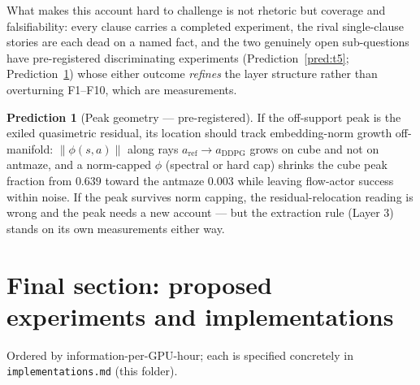 \documentclass[11pt]{article}
\theoremstyle{definition}
\newtheorem{prediction}{Prediction}
\theoremstyle{remark}
\begin{document}
What makes this account hard to challenge is not rhetoric but coverage and falsifiability:
every clause carries a completed experiment, the rival single-clause stories are each dead
on a named fact, and the two genuinely open sub-questions have pre-registered discriminating
experiments (Prediction~\ref{pred:t5}; Prediction~\ref{pred:peak}) whose either outcome
\emph{refines} the layer structure rather than overturning F1--F10, which are measurements.

\begin{prediction}[Peak geometry --- pre-registered]\label{pred:peak}
If the off-support peak is the exiled quasimetric residual, its location should track
embedding-norm growth off-manifold: $\|\phi(s,a)\|$ along rays
$a_{\mathrm{ref}}\to a_{\mathrm{DDPG}}$ grows on cube and not on antmaze, and a norm-capped
$\phi$ (spectral or hard cap) shrinks the cube peak fraction from $0.639$ toward the antmaze
$0.003$ while leaving flow-actor success within noise. If the peak survives norm capping,
the residual-relocation reading is wrong and the peak needs a new account --- but the
extraction rule (Layer 3) stands on its own measurements either way.
\end{prediction}

\section{Final section: proposed experiments and implementations}\label{sec:impl}

Ordered by information-per-GPU-hour; each is specified concretely in
\texttt{implementations.md} (this folder).
\end{document}
